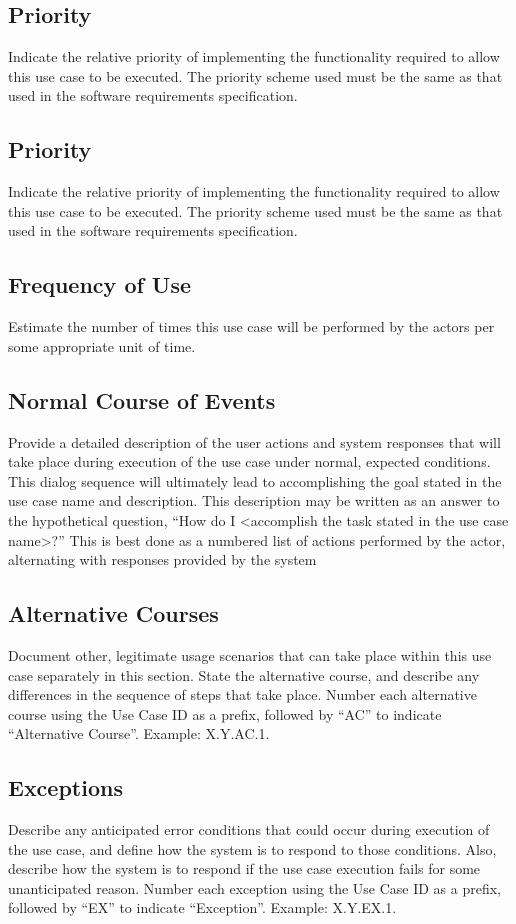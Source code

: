 \documentclass[a4paper]{article}
\begin{document}
\subsection{Priority}
Indicate the relative priority of implementing the functionality required to allow this use case to be executed. The priority scheme used must be the same as that used in the software requirements specification.
\subsection{Priority}
Indicate the relative priority of implementing the functionality required to allow this use case to be executed. The priority scheme used must be the same as that used in the software requirements specification.
\subsection{Frequency of Use}
Estimate the number of times this use case will be performed by the actors per some appropriate unit of time.
\subsection{Normal Course of Events}
Provide a detailed description of the user actions and system responses that will take place during execution of the use case under normal, expected conditions. This dialog sequence will ultimately lead to accomplishing the goal stated in the use case name and description. This description may be written as an answer to the hypothetical question, “How do I <accomplish the task stated in the use case name>?” This is best done as a numbered list of actions performed by the actor, alternating with responses provided by the system
\subsection{Alternative Courses}
Document other, legitimate usage scenarios that can take place within this use case separately in this section. State the alternative course, and describe any differences in the sequence of steps that take place. Number each alternative course using the Use Case ID as a prefix, followed by “AC” to indicate “Alternative Course”. Example:  X.Y.AC.1.
\subsection{Exceptions}
Describe any anticipated error conditions that could occur during execution of the use case, and define how the system is to respond to those conditions. Also, describe how the system is to respond if the use case execution fails for some unanticipated reason. Number each exception using the Use Case ID as a prefix, followed by “EX” to indicate “Exception”. Example:  X.Y.EX.1.
\end{document}
